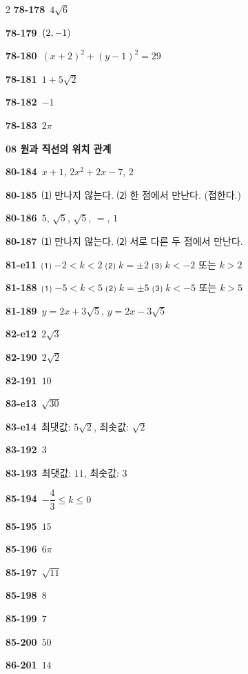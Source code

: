 \documentclass[10pt,a4paper]{article}
\begin{document}
\begin{multicols}{2}
\noindent\textbf{78-178}\ $4\sqrt{6}$\par
\noindent\textbf{78-179}\ $(2{,}\mkern3mu\mathopen{}-1)$\par
\noindent\textbf{78-180}\ $(x+2)^2+(y-1)^2=29$\par
\noindent\textbf{78-181}\ $1+5\sqrt{2}$\par
\noindent\textbf{78-182}\ $-1$\par
\noindent\textbf{78-183}\ $2\pi$\par
\noindent\textbf{08 원과 직선의 위치 관계}\par\smallskip
\noindent\textbf{80-184}\ $x+1$, $2x^2+2x-7$, $2$\par
\noindent\textbf{80-185}\ ⑴ 만나지 않는다. ⑵ 한 점에서 만난다. (접한다.)\par
\noindent\textbf{80-186}\ $5$, $\sqrt{5}$, $\sqrt{5}$, $=$, $1$\par
\noindent\textbf{80-187}\ ⑴ 만나지 않는다. ⑵ 서로 다른 두 점에서 만난다.\par
\noindent\textbf{81-e11}\ ⑴ $-2<k<2$ ⑵ $k=\pm 2$ ⑶ $k<-2$ 또는 $k>2$\par
\noindent\textbf{81-188}\ ⑴ $-5<k<5$ ⑵ $k=\pm 5$ ⑶ $k<-5$ 또는 $k>5$\par
\noindent\textbf{81-189}\ $y=2x+3\sqrt{5}$, $y=2x-3\sqrt{5}$\par
\noindent\textbf{82-e12}\ $2\sqrt{3}$\par
\noindent\textbf{82-190}\ $2\sqrt{2}$\par
\noindent\textbf{82-191}\ $10$\par
\noindent\textbf{83-e13}\ $\sqrt{30}$\par
\noindent\textbf{83-e14}\ 최댓값: $5\sqrt{2}$, 최솟값: $\sqrt{2}$\par
\noindent\textbf{83-192}\ $3$\par
\noindent\textbf{83-193}\ 최댓값: $11$, 최솟값: $3$\par
\noindent\textbf{85-194}\ $-\dfrac{4}{3}\le k\le 0$\par
\noindent\textbf{85-195}\ $15$\par
\noindent\textbf{85-196}\ $6\pi$\par
\noindent\textbf{85-197}\ $\sqrt{11}$\par
\noindent\textbf{85-198}\ $8$\par
\noindent\textbf{85-199}\ $7$\par
\noindent\textbf{85-200}\ $50$\par
\noindent\textbf{86-201}\ $14$\par

\end{multicols}
\end{document}
